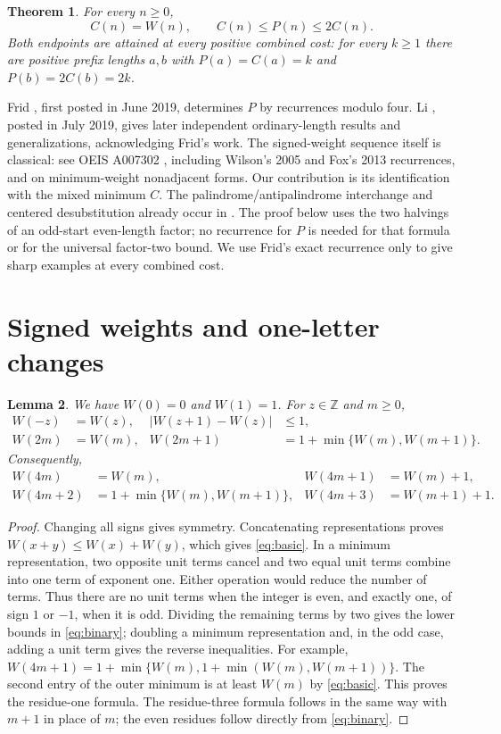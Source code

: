 \documentclass[11pt]{article}
\newtheorem{theorem}{Theorem}
\newtheorem{lemma}[theorem]{Lemma}
\begin{document}
\begin{theorem}\label{thm:main}
For every $n\geq0$,
\[
 C(n)=W(n),\qquad C(n)\leq P(n)\leq2C(n).
\]
Both endpoints are attained at every positive combined cost: for every
$k\geq1$ there are positive prefix lengths $a,b$ with
$P(a)=C(a)=k$ and $P(b)=2C(b)=2k$.
\end{theorem}

Frid \cite[Lemma~3 and Theorem~4]{Frid}, first posted in June 2019,
determines $P$ by recurrences modulo four. Li \cite[Introduction and
Proposition~1]{Li}, posted in July 2019, gives later independent
ordinary-length results and generalizations, acknowledging Frid's work.
The signed-weight sequence itself is classical: see OEIS A007302
\cite{OEIS}, including Wilson's 2005 and Fox's 2013 recurrences, and
\cite[Section~2, p.~3]{KW} on minimum-weight nonadjacent forms.
Our contribution is its identification with the mixed minimum $C$.
The palindrome/antipalindrome interchange and centered desubstitution
already occur in \cite[Section~5, Proposition~6 and Lemmas~2--3]{BBGL}.
The proof below uses the two
halvings of an odd-start even-length factor; no recurrence for $P$ is needed
for that formula or for the universal factor-two bound. We use Frid's exact
recurrence only to give sharp examples at every combined cost.

\section{Signed weights and one-letter changes}
\begin{lemma}\label{lem:weight}
We have $W(0)=0$ and $W(1)=1$. For $z\in\mathbb Z$ and $m\geq0$,
\begin{align}
 W(-z)&=W(z),
 &|W(z+1)-W(z)|&\leq1,\label{eq:basic}\\
 W(2m)&=W(m),
 &W(2m+1)&=1+\min\{W(m),W(m+1)\}.\label{eq:binary}
\end{align}
Consequently,
\begin{align}
 W(4m)&=W(m),&W(4m+1)&=W(m)+1,\nonumber\\
 W(4m+2)&=1+\min\{W(m),W(m+1)\},
 &W(4m+3)&=W(m+1)+1.\label{eq:four}
\end{align}
\end{lemma}
\begin{proof}
Changing all signs gives symmetry. Concatenating representations proves
$W(x+y)\leq W(x)+W(y)$, which gives \eqref{eq:basic}.
In a minimum representation, two opposite unit terms cancel and two
equal unit terms combine into one term of exponent one. Either operation
would reduce the number of terms. Thus there are no unit terms when the
integer is even, and exactly one, of sign $1$ or $-1$, when it is odd.
Dividing the remaining terms by two gives the lower bounds in
\eqref{eq:binary}; doubling a minimum representation and, in the odd case,
adding a unit term gives the reverse inequalities.
For example,
$W(4m+1)=1+\min\{W(m),1+\min(W(m),W(m+1))\}$.
The second entry of the outer minimum is at least $W(m)$ by
\eqref{eq:basic}. This proves the residue-one formula. The residue-three
formula follows in the same way with $m+1$ in place of $m$; the even
residues follow directly from \eqref{eq:binary}.
\end{proof}
\end{document}
